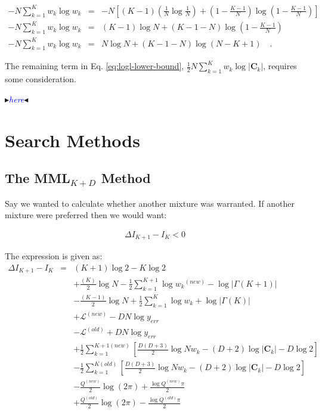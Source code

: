 \documentclass{elsarticle}
\newcommand{\nbb}[2]{
    \fcolorbox{black}{cyan}{\bfseries\sffamily\scriptsize#1}
    {\sf$\blacktriangleright$\textcolor{blue}{\textit{#2}}$\blacktriangleleft$}
}
\newcommand{\andy}[1]{\nbb{Andy}{#1}}
\newcommand{\vect}[1]{\boldsymbol{\mathbf{#1}}}
\renewcommand{\vec}[1]{\vect{#1}}
\def\cov{C}
\def\veccov{\vect{\cov}}
\def\weight{w}
\begin{document}
\begin{eqnarray}
-N\sum_{k=1}^{K}\weight_{k}\log\weight_k &=& -N\left[(K-1)\left(\frac{1}{N}\log\frac{1}{N}\right) + \left(1 - \frac{K-1}{N}\right)\log\left(1 - \frac{K-1}{N}\right)\right] \nonumber \\
-N\sum_{k=1}^{K}\weight_{k}\log\weight_k &=& (K - 1)\log{N} + (K - 1 - N)\log\left(1-\frac{K-1}{N}\right) \nonumber \\
-N\sum_{k=1}^{K}\weight_{k}\log\weight_k &=& N\log{N} + (K - 1 - N)\log\left(N-K+1\right) \quad .
\end{eqnarray}

The remaining term in Eq. \ref{eq:logl-lower-bound}, $\frac{1}{2}N\sum_{k=1}^{K}\weight_{k}\log|\vec{\cov}_k|$, requires some  consideration.

\andy{here}









\section{Search Methods}

\subsection{The MML$_{K+D}$ Method}
Say we wanted to calculate whether another mixture was warranted. If another
mixture were preferred then we would want:

\begin{eqnarray}
  \Delta{}I_{K+1} - I_{K} < 0
\end{eqnarray}

The expression is given as:
\begin{eqnarray*}
\Delta{I_{K+1} - I_K} & = & (K + 1)\log{2} - K\log{2} \\ %
  &&+ \frac{(K)}{2}\log{N} - \frac{1}{2}\sum_{k=1}^{K+1}\log{w_k}^{(new)} - \log{|\Gamma(K+1)|} \\ %
  &&- \frac{(K - 1)}{2}\log{N} + \frac{1}{2}\sum_{k=1}^{K}\log{w_k} + \log{|\Gamma(K)|}\\ %
  &&+ \mathcal{L}^{(new)} - DN\log{y_{err}} \\ %
  &&- \mathcal{L}^{(old)} + DN\log{y_{err}} \\ %
  &&+ \frac{1}{2}\sum_{k=1}^{K+1(new)}\left[\frac{D(D+3)}{2}\log{{Nw_k}} - (D + 2)\log{|\veccov_k|} - D\log{2}\right] \\ %
  &&- \frac{1}{2}\sum_{k=1}^{K(old)}\left[\frac{D(D+3)}{2}\log{{Nw_k}} - (D + 2)\log{|\veccov_k|} - D\log{2}\right] \\ %
  &&- \frac{Q^{(new)}}{2}\log(2\pi) + \frac{\log{Q^{(new)}\pi}}{2} \\ %
  &&+ \frac{Q^{(old)}}{2}\log(2\pi) - \frac{\log{Q^{(old)}\pi}}{2} %
\end{eqnarray*}
\end{document}
